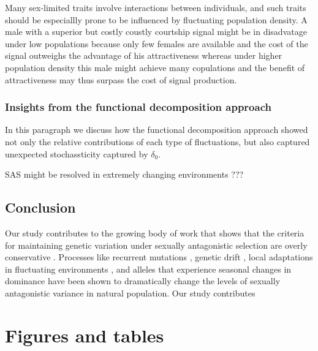 \documentclass[12pt]{article}
\begin{document}
Many sex-limited traits involve interactions between individuals, and such traits should be especiallly prone to be influenced by fluctuating population density. A male with a superior but costly coustly courtship signal might be in disadvatage under low populations because only few females are available and the cost of the signal outweighs the advantage of his attractiveness whereas under higher population density this male might achieve many copulations and the benefit of attractiveness may thus surpass the cost of signal production.  \citep{reinhold2000maintenance}

\subsubsection*{Insights from the functional decomposition approach}

In this paragraph we discuss how the functional decomposition approach showed not only the relative contributions of each type of fluctuations, but also captured unexpected stochassticity captured by $\delta_{0}$.


SAS might be resolved in extremely changing environments ??? \citep{de2018climatic}


\subsection*{Conclusion}

Our study contributes to the growing body of work that shows that the criteria for maintaining genetic variation under sexually antagonistic selection are overly conservative \citep{connallon2012general,connallon_evolutionary_2018}. Processes like recurrent mutations \citep{radwan_maintenance_2008}, genetic drift \citep{connallon2012general}, local adaptations in fluctuating environments \citep{connallon_evolutionary_2018}, and alleles that experience seasonal changes in dominance \citep{wittmann2017seasonally} have been shown to dramatically change the levels of sexually antagonistic variance in natural population. Our study contributes

\clearpage
\section*{Figures and tables }
\end{document}
